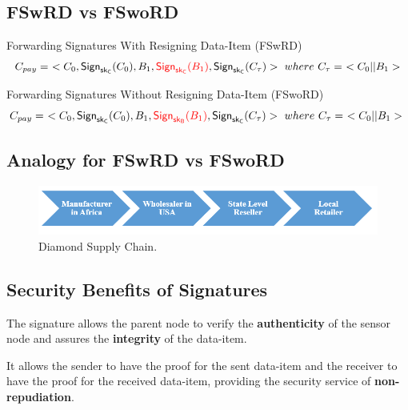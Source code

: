 \documentclass[%
  slidesonly,%
  semlayer%
  ]{seminar}                                  %
\newcommand{\sk}{\sf{sk}}
\begin{document}
\begin{slide}
    \subsection*{FSwRD vs FSwoRD}

      Forwarding Signatures With Resigning Data-Item (FSwRD)
      \begin{equation*}  
        \begin{array}{l}
          C_{pay} =\ <C_{0},\textsf{Sign}_{\sk_{C}}(C_{0}),B_{1},\textcolor{red}{\textsf{Sign}_{\sk_{C}}(B_{1})}, \textsf{Sign}_{\sk_{C}}(C_{\tau})>\ where\ C_{\tau} =\ <C_{0} || B_{1}>\\
        \end{array}
      \end{equation*}

      Forwarding Signatures Without Resigning Data-Item (FSwoRD)
      \begin{equation*}
          C_{pay} =\ <C_{0}, \textsf{Sign}_{\sk_{C}}(C_{0}), B_{1}, \textcolor{red}{\textsf{Sign}_{\sk_{B}}(B_{1})}, \textsf{Sign}_{\sk_{C}}(C_{\tau}) >\ where\ C_{\tau} =\ <C_{0} || B_{1}>\\
      \end{equation*}
      
      \clearpage

    \subsection*{Analogy for FSwRD vs FSwoRD}
      \begin{figure}[h!]
        \centering
        \includegraphics[scale=0.5]{images/diamond-supply-chain.png}
        \caption{Diamond Supply Chain.}
        \label{fig:diamond-supply-chain}
      \end{figure}
      \clearpage

    \subsection*{Security Benefits of Signatures}
      The signature allows the parent node to verify the \textbf{authenticity} of the sensor node and assures the \textbf{integrity} of the data-item.

      It allows the sender to have the proof for the sent data-item and the receiver to have the proof for the received data-item, providing the security service of \textbf{non-repudiation}.


\end{slide}
\end{document}
